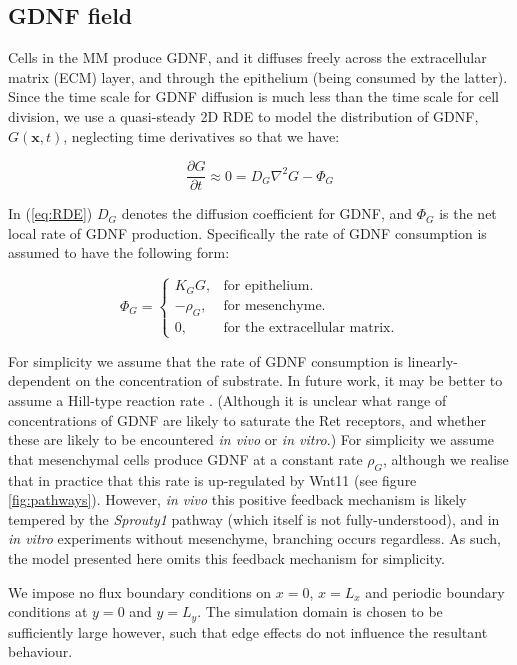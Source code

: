 \documentclass[pdftex,10pt,a4paper,twocolumn]{article}
\begin{document}
\subsection{GDNF field}
Cells in the MM produce GDNF, and it diffuses freely across the extracellular matrix (ECM) layer, and through the epithelium (being consumed by the latter). Since the time scale for GDNF diffusion is much less than the time scale for cell division, we use a quasi-steady 2D RDE to model the distribution of GDNF, $G(\mathbf{x},t)$, neglecting time derivatives so that we have:

\begin{equation}\label{eq:RDE}
\frac{\partial G}{\partial t} \approx 0 = D_G \nabla^2 G - \Phi_G
\end{equation}

In (\ref{eq:RDE}) $D_G$ denotes the diffusion coefficient for GDNF, and $\Phi_G$ is the net local rate of GDNF production. Specifically the rate of GDNF consumption is assumed to have the following form:

\begin{equation} \label{eq:production}
\Phi_G =\begin{cases}
K_G G, & \text{for epithelium}.\\
-\rho_G, & \text{for mesenchyme}.\\
0, & \text{for the extracellular matrix}.
\end{cases}
\end{equation}

For simplicity we assume that the rate of GDNF consumption is linearly-dependent on the concentration of substrate. In future work, it may be better to assume a Hill-type reaction rate \cite{MenshykauDIber}. (Although it is unclear what range of concentrations of GDNF are likely to saturate the Ret receptors, and whether these are likely to be encountered \textit{in vivo} or \textit{in vitro}.) For simplicity we assume that mesenchymal cells produce GDNF at a constant rate $\rho_G$, although we realise that in practice that this rate is up-regulated by Wnt11 (see figure \ref{fig:pathways}). However, \textit{in vivo} this positive feedback mechanism is likely tempered by the \textit{Sprouty1} pathway (which itself is not fully-understood), and in \textit{in vitro} experiments without mesenchyme, branching occurs regardless. As such, the model presented here omits this feedback mechanism for simplicity.

We impose no flux boundary conditions on $x=0$, $x=L_x$ and periodic boundary conditions at $y=0$ and $y=L_y$. The simulation domain is chosen to be sufficiently large however, such that edge effects do not influence the resultant behaviour.
\end{document}
